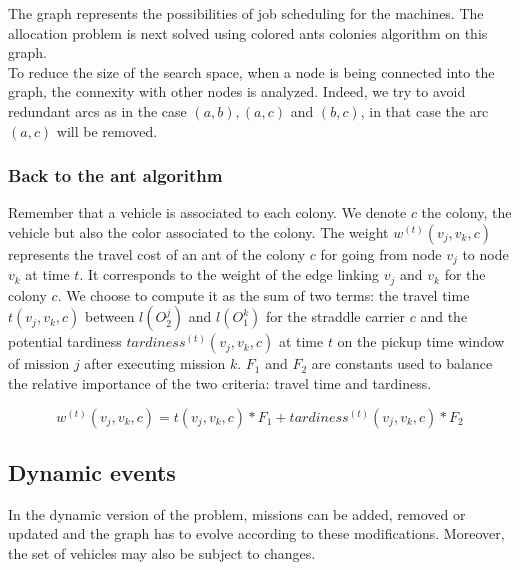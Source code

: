 \documentclass[a4paper,10pt]{article}
\begin{document}
The graph represents the possibilities of job scheduling for the machines. The allocation problem is next solved using colored ants colonies algorithm on this graph.\\

To reduce the size of the search space, when a node is being connected into the graph, the connexity with other nodes is analyzed. Indeed, we try to avoid redundant arcs as in the case $(a,b), (a,c)$ and $(b,c)$, in that case the arc $(a,c)$ will be removed.%

\subsubsection{Back to the ant algorithm}

Remember that a vehicle is associated to each colony. We denote $c$ the colony, the vehicle but also the color associated to the colony. The weight $w^{(t)}(v_j,v_k,c)$ represents the travel cost of an ant of the colony $c$ for going from node $v_j$ to node $v_k$ at time $t$. It corresponds to the weight of the edge linking $v_j$ and $v_k$ for the colony $c$. We choose to compute it as the sum of two terms: the travel time $t(v_j,v_k,c)$ between $l(O_2^j)$ and $l(O_1^k)$ for the straddle carrier $c$ and the potential tardiness $tardiness^{(t)}(v_j,v_k,c)$ at time $t$ on the pickup time window of mission $j$ after executing mission $k$. $F_1$ and $F_2$ are constants used to balance the relative importance of the two criteria: travel time and tardiness.

\begin{equation*}
  w^{(t)}(v_j,v_k,c) = t(v_j,v_k,c)*F_1 + tardiness^{(t)}(v_j,v_k,c)*F_2
\end{equation*}

\subsection{Dynamic events}

In the dynamic version of the problem, missions can be added, removed or updated and the graph has to evolve according to these modifications. Moreover, the set of vehicles may also be subject to changes.\\
\end{document}
